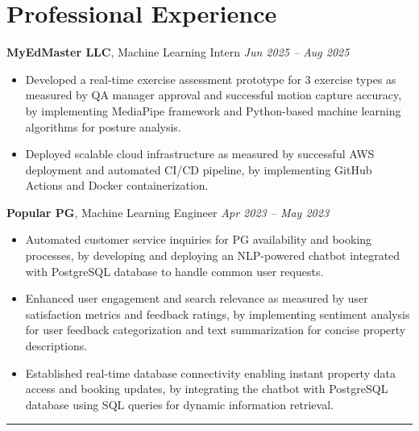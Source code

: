 \documentclass[a4paper,10pt]{article}
\newcommand{\sectionline}{\vspace{-0.2em}\noindent\rule{\linewidth}{0.6pt}\vspace{-0.5em}}
\begin{document}
\section*{Professional Experience}
\textbf{MyEdMaster LLC}, Machine Learning Intern \hfill \textit{Jun 2025 -- Aug 2025}
\begin{itemize}[leftmargin=1.5em, itemsep=0em, parsep=0pt]
  \item Developed a real-time exercise assessment prototype for 3 exercise types as measured by QA manager approval and successful motion capture accuracy, by implementing MediaPipe framework and Python-based machine learning algorithms for posture analysis.
  \item Deployed scalable cloud infrastructure as measured by successful AWS deployment and automated CI/CD pipeline, by implementing GitHub Actions and Docker containerization.
\end{itemize}
\textbf{Popular PG}, Machine Learning Engineer \hfill \textit{Apr 2023 -- May 2023}
\begin{itemize}[leftmargin=1.5em, itemsep=0em, parsep=0pt]
  \item Automated customer service inquiries for PG availability and booking processes, by developing and deploying an NLP-powered chatbot integrated with PostgreSQL database to handle common user requests.
  \item Enhanced user engagement and search relevance as measured by user satisfaction metrics and feedback ratings, by implementing sentiment analysis for user feedback categorization and text summarization for concise property descriptions.
  \item Established real-time database connectivity enabling instant property data access and booking updates, by integrating the chatbot with PostgreSQL database using SQL queries for dynamic information retrieval.
\end{itemize}
\sectionline
\end{document}
